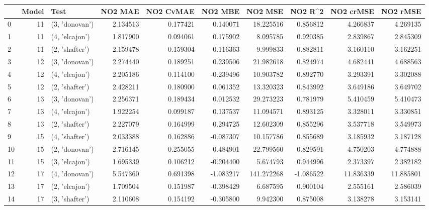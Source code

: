 \begin{tabular}{lrlrrrrrrr}
\toprule
{} &  Model &            Test &   NO2 MAE &  NO2 CvMAE &   NO2 MBE &     NO2 MSE &   NO2 R\textasciicircum2 &  NO2 crMSE &   NO2 rMSE \\
\midrule
0  &     11 &  (3, 'donovan') &  2.134513 &   0.177421 &  0.140071 &   18.225516 &  0.856812 &   4.266837 &   4.269135 \\
1  &     11 &  (4, 'elcajon') &  1.817900 &   0.094061 &  0.175902 &    8.095785 &  0.920385 &   2.839867 &   2.845309 \\
2  &     11 &  (2, 'shafter') &  2.159478 &   0.159304 &  0.116363 &    9.999833 &  0.882811 &   3.160110 &   3.162251 \\
3  &     12 &  (3, 'donovan') &  2.274440 &   0.189251 &  0.239506 &   21.982618 &  0.824974 &   4.682441 &   4.688563 \\
4  &     12 &  (4, 'elcajon') &  2.205186 &   0.114100 & -0.239496 &   10.903782 &  0.892770 &   3.293391 &   3.302088 \\
5  &     12 &  (2, 'shafter') &  2.428211 &   0.180900 &  0.061352 &   13.320323 &  0.843992 &   3.649186 &   3.649702 \\
6  &     13 &  (3, 'donovan') &  2.256371 &   0.189434 &  0.012532 &   29.273223 &  0.781979 &   5.410459 &   5.410473 \\
7  &     13 &  (4, 'elcajon') &  1.922254 &   0.099187 &  0.137537 &   11.094571 &  0.893125 &   3.328011 &   3.330851 \\
8  &     13 &  (2, 'shafter') &  2.227079 &   0.164999 &  0.294725 &   12.602309 &  0.855296 &   3.537718 &   3.549973 \\
9  &     15 &  (4, 'shafter') &  2.033388 &   0.162886 & -0.087307 &   10.157786 &  0.855689 &   3.185932 &   3.187128 \\
10 &     15 &  (2, 'donovan') &  2.716145 &   0.255055 &  0.484901 &   22.799560 &  0.829591 &   4.750203 &   4.774888 \\
11 &     15 &  (3, 'elcajon') &  1.695339 &   0.106212 & -0.204400 &    5.674793 &  0.944996 &   2.373397 &   2.382182 \\
12 &     17 &  (4, 'donovan') &  5.547360 &   0.691398 & -1.083217 &  141.272268 & -1.086522 &  11.836339 &  11.885801 \\
13 &     17 &  (2, 'elcajon') &  1.709504 &   0.151987 & -0.398429 &    6.687595 &  0.900104 &   2.555161 &   2.586039 \\
14 &     17 &  (3, 'shafter') &  2.110608 &   0.154192 & -0.305800 &    9.942300 &  0.875008 &   3.138278 &   3.153141 \\

\end{tabular}
